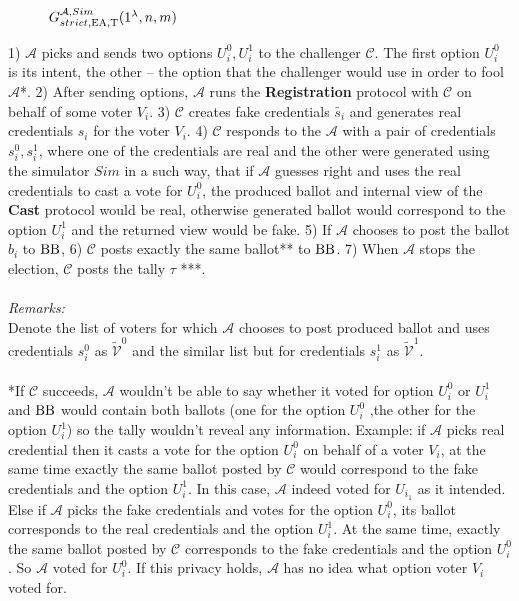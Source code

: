   \begin{figure}[h!]
 
        \caption{$G_{strict,\operatorname{EA},\operatorname{T}}^{\mathcal{A}, Sim}(1^{\lambda},n,m)$}
        \label{EAT is honest}
\end{figure}
1)  $\mathcal{A}$ picks and sends two options $U_i^0,U_i^1$ to the challenger $\mathcal{C}$. The first option $U_i^0$ is its intent, the other -- the option that the challenger would use in order to fool $\mathcal{A}$*. 2) After sending options, $\mathcal{A}$ runs the   \textbf{Registration} protocol with $\mathcal{C}$ on behalf of some voter $V_i$. 3) $\mathcal{C}$ creates fake credentials $\tilde{s_i}$ and generates real credentials $s_i$ for the voter $V_i$. 4) $\mathcal{C}$ responds to the $\mathcal{A}$ with a pair of credentials $s_i^0,s_i^1$, where one of the credentials are real and the other were generated using the simulator $Sim$ in a such way, that if $\mathcal{A}$ guesses right and uses the real credentials to cast a vote for $U_i^0$, the produced ballot and internal view of the \textbf{Cast} protocol would be real, otherwise generated ballot would correspond to the option $U_i^1$ and the returned view would be fake. 5) If $\mathcal{A}$ chooses to post the ballot $b_i$ to $\operatorname{BB}$, 6) $\mathcal{C}$ posts exactly the same ballot** to $\operatorname{BB}$. 7) When $\mathcal{A}$ stops the election, $\mathcal{C}$ posts the tally $\tau$ ***. \\\\
\textit{Remarks:}\\
Denote the list of voters for which $\mathcal{A}$ chooses to post produced ballot and uses credentials $s_i^0$  as $ \tilde{\mathcal{V}}^0$ and the similar list but for credentials $s_i^1$ as $ \tilde{\mathcal{V}}^1$. \\\\
*If  $\mathcal{C}$ succeeds, $\mathcal{A}$ wouldn't be able to say whether it voted for option $U_i^0$ or $U_i^1$ and $\operatorname{BB}$ would contain both ballots (one for the option $U_i^0$ ,the other for the option $U_i^1$) so the tally wouldn't reveal any information. Example: if $\mathcal{A}$  picks real credential then it casts a vote for the option  $U_i^0$ on behalf of a voter $V_i$, at the same time exactly the same ballot posted by $\mathcal{C}$ would correspond to the fake credentials and the option $U_i^1$. In this case, $\mathcal{A}$ indeed voted for $U_{i_1}$ as it intended. Else if $\mathcal{A}$ picks the fake credentials and votes for the option $U_i^0$,  its ballot corresponds to the real credentials and  the option $U_i^1$. At the same time, exactly the same ballot posted by $\mathcal{C}$ corresponds to the fake credentials  and the option $U_i^0$. So $\mathcal{A}$  voted for $U_i^0$. If this privacy holds,  $\mathcal{A}$ has no idea what option voter $V_i$ voted for. \\\\
